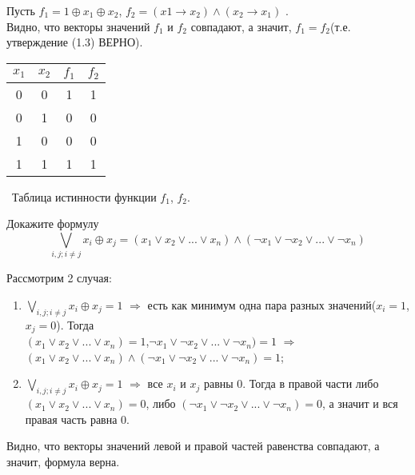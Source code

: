 \begin{solution}
\begin{paracol}{2}
 
 Пусть $f_1=1\oplus x_1\oplus x_2$, $f_2=(x1\rightarrow x_2)\wedge(x_2\rightarrow x_1)$ . \\

 Видно, что векторы значений $f_1$ и $f_2$ совпадают, а значит, $f_1=f_2$(т.е. утверждение (1.3) ВЕРНО).

 \switchcolumn
 
\begin{center}
 \begin{tabular}{| c c | c | c |}
  \hline	
 $ x_1$ & $x_2$ & $f_1$ & $f_2$ \T\B\\
  \hline\hline
  0 & 0 & 1 & 1\T\B \\
  0 & 1 & 0 & 0 \B \\
  1 & 0 & 0 & 0 \B \\
  1 & 1 & 1 & 1 \B \\
  \hline
 \end{tabular}
 \vspace{1 cm}
 
 \
 \small Таблица истинности функции $f_1$, $f_2$. 
 
 
 \end{center}
 \end{paracol}
\end{solution}

\begin{exercise}
Докажите формулу
\begin{equation}
		\bigvee_{i,j;i\neq j} x_i\oplus x_j=(x_1\vee x_2\vee ...\vee x_n)\wedge(\neg x_1\vee \neg x_2\vee ...\vee \neg x_n)
\end{equation}

\end{exercise}

\begin{solution}
Рассмотрим 2 случая: \\
\begin{enumerate}
	\item $\bigvee_{i,j;i\neq j} x_i\oplus x_j=1$ $\Rightarrow$ есть как минимум одна пара разных значений($x_i=1$,$x_j=0$). Тогда\\
$(x_1\vee x_2\vee ...\vee x_n)=1$,$\neg x_1\vee \neg x_2\vee ...\vee \neg x_n)=1$ $\Rightarrow$ $(x_1\vee x_2\vee ...\vee x_n)\wedge(\neg x_1\vee \neg x_2\vee ...\vee \neg x_n)=1$;
	\item $\bigvee_{i,j;i\neq j} x_i\oplus x_j=1$ $\Rightarrow$ все $x_i$ и $x_j$ равны 0. Тогда в правой части либо $(x_1\vee x_2\vee ...\vee x_n)=0$, либо $(\neg x_1\vee \neg x_2\vee ...\vee \neg x_n)=0$, а значит и вся правая часть равна 0.
\end{enumerate}
Видно, что векторы значений левой и правой частей равенства совпадают, а значит, формула верна.

\end{solution}



